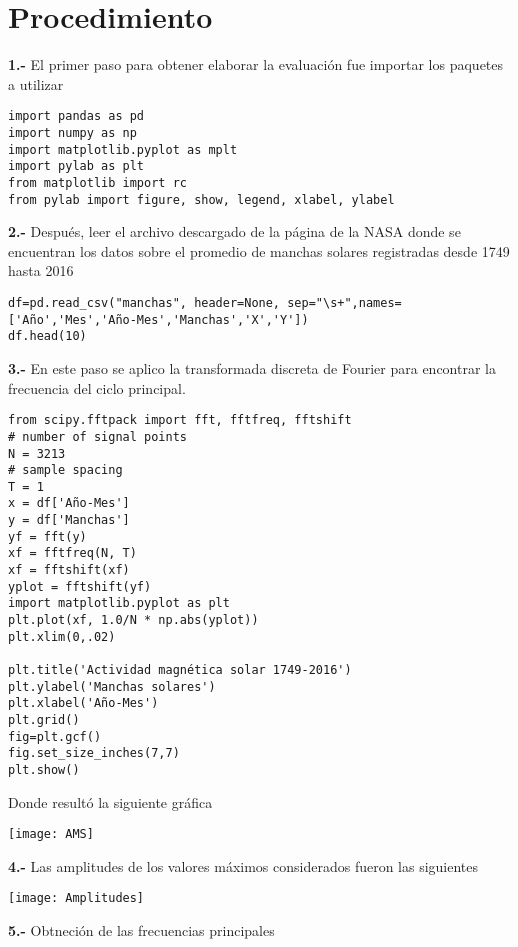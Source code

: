 \documentclass[12pt]{article}
\begin{document}
\section*{Procedimiento}

\textbf{1.-} El primer paso para obtener elaborar la evaluación fue importar los paquetes a utilizar 

\begin{verbatim}
import pandas as pd
import numpy as np
import matplotlib.pyplot as mplt
import pylab as plt
from matplotlib import rc
from pylab import figure, show, legend, xlabel, ylabel
\end{verbatim}

\textbf{2.-} Después, leer el archivo descargado de la página de la NASA donde se encuentran los datos sobre el promedio de manchas solares registradas desde 1749 hasta 2016

\begin{verbatim}
df=pd.read_csv("manchas", header=None, sep="\s+",names= ['Año','Mes','Año-Mes','Manchas','X','Y'])
df.head(10)
\end{verbatim}

\textbf{3.-} En este paso se aplico la transformada discreta de Fourier para encontrar la frecuencia del ciclo principal.

\begin{verbatim}
from scipy.fftpack import fft, fftfreq, fftshift
# number of signal points
N = 3213
# sample spacing
T = 1
x = df['Año-Mes']
y = df['Manchas']
yf = fft(y)
xf = fftfreq(N, T)
xf = fftshift(xf)
yplot = fftshift(yf)
import matplotlib.pyplot as plt
plt.plot(xf, 1.0/N * np.abs(yplot))
plt.xlim(0,.02)

plt.title('Actividad magnética solar 1749-2016')
plt.ylabel('Manchas solares')
plt.xlabel('Año-Mes')
plt.grid()
fig=plt.gcf()
fig.set_size_inches(7,7)
plt.show()
\end{verbatim}

Donde resultó la siguiente gráfica

\begin{center}
\texttt{[image: AMS]}
\end{center}

\textbf{4.-} Las amplitudes de los valores máximos considerados fueron las siguientes

\begin{center}
\texttt{[image: Amplitudes]}
\end{center}


\textbf{5.-} Obtneción de las frecuencias principales
\end{document}
